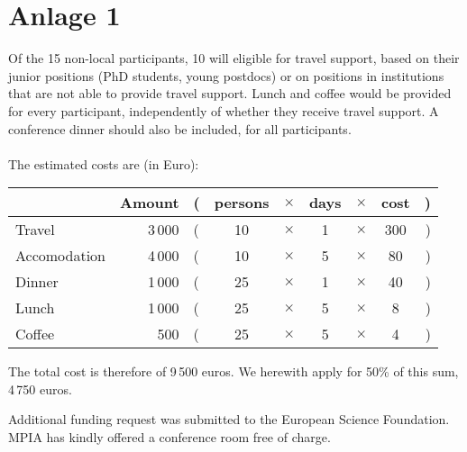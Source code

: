 \documentclass{article}
\begin{document}
\section*{Anlage 1}

Of the 15 non-local participants, 10 will eligible for travel 
support, based on their junior positions (PhD students, young
postdocs) or on positions in institutions that are not able to provide
travel support. Lunch and coffee would be provided for every participant, 
independently of whether they receive travel support. A conference dinner 
should also be included, for all participants.
\\ \\
The estimated costs are (in Euro):
\begin{center}
  \begin{tabular}{|l | r l c c c c c r|}\hline
                & Amount &(& persons &$\times$& days &$\times$& cost &)\\\hline
  Travel        & 3\,000 &(& 10      &$\times$&  1   &$\times$& 300  &)\\
  Accomodation  & 4\,000 &(& 10      &$\times$&  5   &$\times$&  80  &)\\
  Dinner        & 1\,000 &(& 25      &$\times$&  1   &$\times$&  40  &)\\
  Lunch         & 1\,000 &(& 25      &$\times$&  5   &$\times$&   8  &)\\
  Coffee        &    500 &(& 25      &$\times$&  5   &$\times$&   4  &)\\\hline
  \end{tabular}
\end{center}

The total cost is therefore of 9\,500 euros. We herewith 
apply for 50\% of this sum, 4\,750 euros.

\vspace{5mm}

 Additional funding request 
was submitted to the European Science Foundation. MPIA has 
kindly offered a conference room free of charge. 
\end{document}
